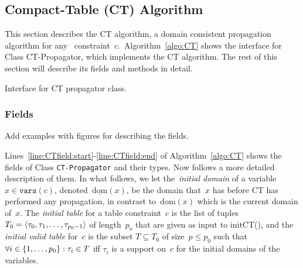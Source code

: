 \documentclass[a4paper,11pt]{article}
\newcommand{\Todo}[1]{{\color{blue}#1}}
\newcommand{\Algoref}[1]{Algorithm~\ref{#1}}
\newcommand{\Table}{\Constraint{Table}~}
\newcommand{\Linesref}[2]{Lines~\ref{#1}-\ref{#2}}
\newcommand{\Dom}[1]{\text{dom}({#1})}
\newcommand{\Dominit}[1]{\underline{\text{dom}}(#1)}
\newcommand{\SparseBitSet}{\texttt{SparseBitSet}}
\newcommand{\Scp}{\texttt{vars}}
\numberwithin{equation}{section}
\begin{document}
\subsection{Compact-Table (CT) Algorithm}
\label{sec:ct}
This section describes the CT algorithm, a domain consistent propagation
algorithm for any \Table constraint~$c$.~\Algoref{algo:CT} shows the interface
for Class CT-Propagator, which implements the CT algorithm. The rest of this
section will describe its fields and methods in detail.




 \begin{algorithm}[H]
  \begin{algorithmic}[1]  %
    
    \end{algorithmic}
  \caption{Interface for CT propagator class.}
  \label{algo:CT}
\end{algorithm}





\subsubsection{Fields}
\label{CT:fields}

\Todo{Add examples with figures for describing the fields.}

\Linesref{line:CTfield:start}{line:CTfield:end} of \Algoref{algo:CT}
shows the fields of Class \texttt{CT-Propagator} and their types.
Now follows a more detailed description of them. In what follows, we let
the~\emph{initial domain} of a variable~$x \in \Scp(c)$, denoted~$\Dominit{x}$,
be the domain that~$x$ has before CT has performed any propagation,
in contrast to~$\Dom{x}$ which is the current domain of~$x$.
The \emph{initial table} for a table constraint~$c$ is the list of tuples
$T_0 = \left\langle\tau_0, \tau_1, \ldots, \tau_{p_0-1}\right\rangle$ of length~$p_o$
that are given as input to initCT(), and the
\emph{initial valid table} for~$c$ is the subset $T \subseteq T_0$ of size~$p \leq p_0$
such that~$\forall i \in \left\{1, \ldots, p_0\right\}: \tau_i \in T$ iff $\tau_i$ 
is a support on~$c$ for the initial domains of the variables. 
\end{document}
